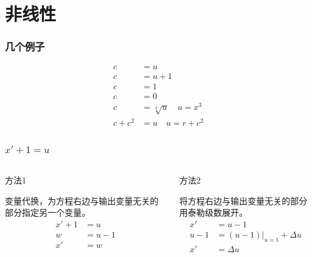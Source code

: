 \documentclass{beamer}
\begin{document}
\section{非线性}
\label{sec-2}
\begin{frame}
\frametitle{几个例子}
\label{sec-2-1}

\begin{align*}
c &= u\\
c &= u+1\\
c &= 1\\
c &= 0\\
c &= \sqrt[3]{u} \quad u= x^3 \\
c+c^2 &= u \quad u=r+c^{2}
\end{align*}
\end{frame}
\begin{frame}
\frametitle{$x'+1 =u$}
\label{sec-2-2}
\begin{columns}
\begin{column}{0.5\textwidth}
\begin{block}{方法1}
\label{sec-2-2-1}

变量代换，为方程右边与输出变量无关的部分指定另一个变量。
\begin{align*}
x'+1 &= u \\
w &= u-1 \\
x' &= w 
\end{align*}
\end{block}
\end{column}
\begin{column}{0.5\textwidth}
\begin{block}{方法2}
\label{sec-2-2-2}

将方程右边与输出变量无关的部分用泰勒级数展开。
\begin{align*}
x' &=u-1 \\
u-1 &= (u-1)|_{u=1}+\Delta u \\
x' &= \Delta u 
\end{align*}
\end{block}
\end{column}
\end{columns}
\end{frame}
\end{document}
